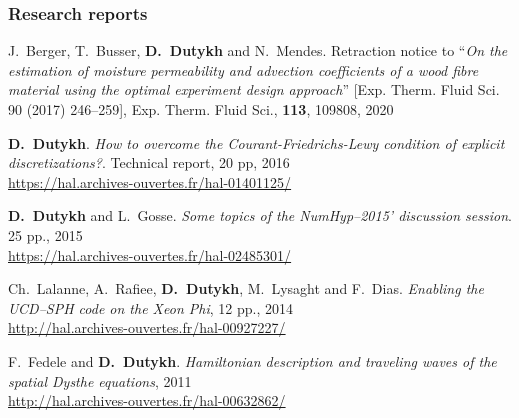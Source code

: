 \separator
\subsubsection{Research reports}

\begin{etaremune}


  
  \item J.~Berger, T.~Busser, \textbf{D.~Dutykh} and N.~Mendes. Retraction notice to ``\textit{On the estimation of moisture permeability and advection coefficients of a wood fibre material using the optimal experiment design approach}'' [Exp. Therm. Fluid Sci. 90 (2017) 246--259], Exp. Therm. Fluid Sci., \textbf{113}, 109808, 2020 %



  \item \textbf{D.~Dutykh}. \textit{How to overcome the Courant-Friedrichs-Lewy condition of explicit discretizations?}. Technical report, 20 pp, 2016 \\ %
  \url{https://hal.archives-ouvertes.fr/hal-01401125/}
  


  \item \textbf{D.~Dutykh} and L.~Gosse. \textit{Some topics of the NumHyp--2015' discussion session}. 25 pp., 2015 \\ %
  \url{https://hal.archives-ouvertes.fr/hal-02485301/}
  

  
  \item Ch.~Lalanne, A.~Rafiee, \textbf{D.~Dutykh}, M.~Lysaght and F.~Dias. \textit{Enabling the UCD--SPH code on the Xeon Phi}, 12 pp., 2014 \\ %
  \url{http://hal.archives-ouvertes.fr/hal-00927227/}
  


  \item F.~Fedele and \textbf{D.~Dutykh}. \textit{Hamiltonian description and traveling waves of the spatial Dysthe equations}, 2011 \\ %
  \url{http://hal.archives-ouvertes.fr/hal-00632862/}
  

\end{etaremune}
